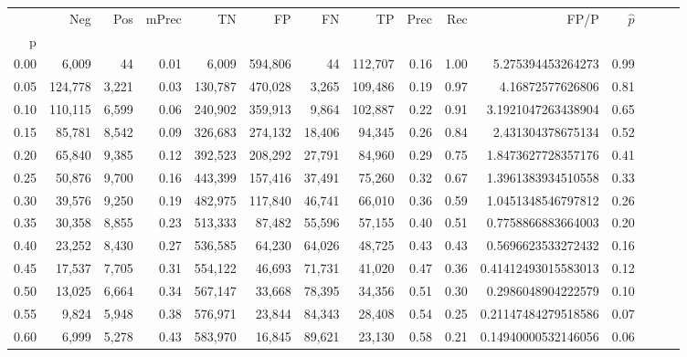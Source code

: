 \begin{tabular}{rrrrrrrrrrrrrrr}
\toprule
{} &      Neg &    Pos & mPrec &       TN &       FP &       FN &       TP &  Prec &   Rec &                  FP/P & $\hat{p}$ \\
p    &          &        &       &          &          &          &          &       &       &                       &           \\
\midrule
0.00 &    6,009 &     44 &  0.01 &    6,009 &  594,806 &       44 &  112,707 &  0.16 &  1.00 &     5.275394453264273 &      0.99 \\
0.05 &  124,778 &  3,221 &  0.03 &  130,787 &  470,028 &    3,265 &  109,486 &  0.19 &  0.97 &      4.16872577626806 &      0.81 \\
0.10 &  110,115 &  6,599 &  0.06 &  240,902 &  359,913 &    9,864 &  102,887 &  0.22 &  0.91 &    3.1921047263438904 &      0.65 \\
0.15 &   85,781 &  8,542 &  0.09 &  326,683 &  274,132 &   18,406 &   94,345 &  0.26 &  0.84 &     2.431304378675134 &      0.52 \\
0.20 &   65,840 &  9,385 &  0.12 &  392,523 &  208,292 &   27,791 &   84,960 &  0.29 &  0.75 &    1.8473627728357176 &      0.41 \\
0.25 &   50,876 &  9,700 &  0.16 &  443,399 &  157,416 &   37,491 &   75,260 &  0.32 &  0.67 &    1.3961383934510558 &      0.33 \\
0.30 &   39,576 &  9,250 &  0.19 &  482,975 &  117,840 &   46,741 &   66,010 &  0.36 &  0.59 &    1.0451348546797812 &      0.26 \\
0.35 &   30,358 &  8,855 &  0.23 &  513,333 &   87,482 &   55,596 &   57,155 &  0.40 &  0.51 &    0.7758866883664003 &      0.20 \\
0.40 &   23,252 &  8,430 &  0.27 &  536,585 &   64,230 &   64,026 &   48,725 &  0.43 &  0.43 &    0.5696623533272432 &      0.16 \\
0.45 &   17,537 &  7,705 &  0.31 &  554,122 &   46,693 &   71,731 &   41,020 &  0.47 &  0.36 &   0.41412493015583013 &      0.12 \\
0.50 &   13,025 &  6,664 &  0.34 &  567,147 &   33,668 &   78,395 &   34,356 &  0.51 &  0.30 &    0.2986048904222579 &      0.10 \\
0.55 &    9,824 &  5,948 &  0.38 &  576,971 &   23,844 &   84,343 &   28,408 &  0.54 &  0.25 &   0.21147484279518586 &      0.07 \\
0.60 &    6,999 &  5,278 &  0.43 &  583,970 &   16,845 &   89,621 &   23,130 &  0.58 &  0.21 &   0.14940000532146056 &      0.06 \\

\end{tabular}
